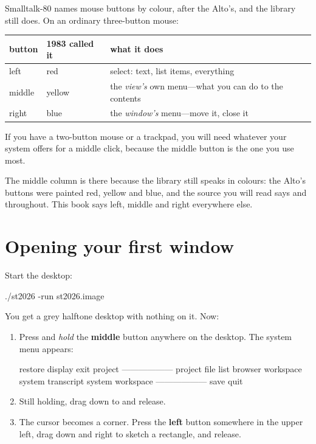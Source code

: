 Smalltalk-80 names mouse buttons by colour, after the Alto's, and the library
still does. On an ordinary three-button mouse:

\begin{center}
\small
\begin{tabular}{@{}llp{}@{}}
\toprule
button & 1983 called it & what it does\\
\midrule
left   & red    & select: text, list items, everything\\
middle & yellow & the \emph{view's} own menu---what you can do to the contents\\
right  & blue   & the \emph{window's} menu---move it, close it\\
\bottomrule
\end{tabular}
\end{center}

If you have a two-button mouse or a trackpad, you will need whatever your
system offers for a middle click, because the middle button is the one you
use most.

The middle column is there because the library still speaks in colours: the
Alto's buttons were painted red, yellow and blue, and the source you will
read says  and  throughout. This
book says left, middle and right everywhere else.

\section{Opening your first window}

Start the desktop:

\begin{sh}
./st2026 -run st2026.image
\end{sh}

You get a grey halftone desktop with nothing on it. Now:

\begin{enumerate}
\item Press and \emph{hold} the \textbf{middle} button anywhere on
  the desktop. The system menu appears:
\begin{plain}
restore display
exit project
------------------
project
file list
browser
workspace
system transcript
system workspace
------------------
save
quit
\end{plain}
\item Still holding, drag down to  and release.
\item The cursor becomes a corner. Press the \textbf{left} button
  somewhere in the upper left, drag down and right to sketch a rectangle, and
  release.
\end{enumerate}

